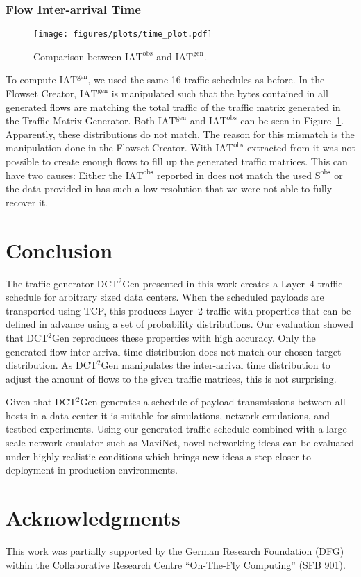 \documentclass[journal,10pt]{IEEEtran}
\newcommand{\genname}{DCT${^2}$Gen}
\newcommand{\lf}{Layer~4}
\newcommand{\iat}[1] {\ensuremath{\mathrm{IAT}^{\mathrm{#1}}}}
\newcommand{\size}[1]{\ensuremath{\mathrm{S}  ^{\mathrm{#1}}}}
\begin{document}
		
		\subsubsection{Flow Inter-arrival Time}

		\begin{figure}
			\centering
				\texttt{[image: figures/plots/time\_plot.pdf]}
				\caption{Comparison between \iat{obs} and \iat{gen}.}
				\label{fig:time_plot}
\end{figure}
		
		To compute \iat{gen}, we used the same 16 traffic schedules as before.
		In the Flowset Creator, \iat{gen} is manipulated such that the bytes contained in all generated flows
		are matching the total traffic of the traffic matrix generated in the Traffic Matrix Generator.
		Both \iat{gen} and \iat{obs} can be seen in Figure~\ref{fig:time_plot}.
		Apparently, these distributions do not match.
		The reason for this mismatch is the manipulation done in the Flowset Creator.
		With \iat{obs} extracted from \cite{MSR-datacenters} it was not possible to
		create enough flows to fill up the generated traffic matrices.
		This can have two causes: Either the
		\iat{obs} reported in \cite{MSR-datacenters} does not match the used \size{obs} or the data provided in \cite{MSR-datacenters}
		has such a low resolution that we were not able to fully recover it.






\section{Conclusion}
\label{sec:conclusion}	 
	The traffic generator \genname{} presented in this work creates a \lf{} traffic schedule for arbitrary sized data centers.
	When the scheduled payloads are transported using TCP, this produces Layer~2 traffic
	with properties that can be defined in advance using a set of probability distributions.
	Our evaluation showed that \genname{} reproduces these properties with high accuracy.
	Only the generated flow inter-arrival time distribution does not match our chosen target distribution.
	As \genname{} manipulates the inter-arrival time distribution to
	adjust the amount of flows to the given traffic matrices, this is not surprising.


	Given that \genname{} generates a schedule of payload transmissions between all hosts in a data center
	it is suitable for simulations, network emulations, and testbed experiments. 
	Using our generated traffic schedule combined with a large-scale network emulator such as MaxiNet,
	novel networking ideas can be evaluated under highly realistic conditions which 
	brings new ideas a step closer to deployment in production environments.


\section*{Acknowledgments}
	This work was partially supported by the German Research Foundation (DFG) within the Collaborative Research Centre ``On-The-Fly Computing'' (SFB 901).

{}

\end{document}
